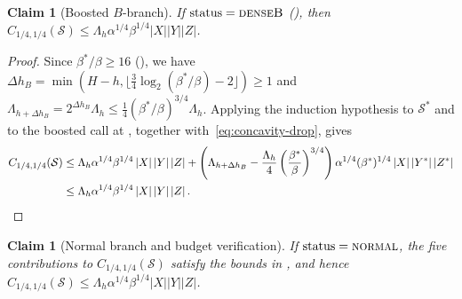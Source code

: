 \documentclass[11pt]{article}
\newtheorem{claim}[theorem]{Claim}
\theoremstyle{definition}
\renewcommand{\label}[1]{}%
\newcommand{\abs}[1]{\left\lvert #1 \right\rvert}
\newcommand{\pot}{C_{1/4,1/4}}
\newcommand{\tagdenseB}{\textnormal{\textsc{denseB}}}
\newcommand{\tagnormal}{\textnormal{\textsc{normal}}}
\begin{document}
\begin{claim}[Boosted $B$-branch]
\label{clm:pot-boost}
If $\text{status} = \tagdenseB$ (), then $\pot(\mathcal{S}) \le \Lambda_h \alpha^{1/4}\beta^{1/4}\abs{X}\abs{Y}\abs{Z}$.
\end{claim}

\begin{proof}
Since $\beta^*/\beta \ge 16$ (), we have $\Delta h_B = \min(H-h, \lfloor \frac{3}{4}\log_2(\beta^*/\beta) - 2 \rfloor) \ge 1$ and $\Lambda_{h + \Delta h_B} = 2^{\Delta h_B}\Lambda_h \le \frac{1}{4}(\beta^*/\beta)^{3/4}\Lambda_h$. Applying the induction hypothesis to $\mathcal{S}^*$ and to the boosted call at , together with~\eqref{eq:concavity-drop}, gives
\begin{align*}
    \pot(\mathcal{S}) &\le \Lambda_h \alpha^{1/4}\beta^{1/4}\abs{X}\abs{Y}\abs{Z} + \left(\Lambda_{h + \Delta h_B} - \frac{\Lambda_h}{4}\left(\frac{\beta^*}{\beta}\right)^{3/4}\right)\alpha^{1/4}(\beta^*)^{1/4}\abs{X}\abs{Y^*}\abs{Z^*} \\
    &\le \Lambda_h \alpha^{1/4}\beta^{1/4}\abs{X}\abs{Y}\abs{Z}. \qedhere
\end{align*}
\end{proof}

\begin{claim}[Normal branch and budget verification]
\label{clm:pot-normal}
If $\text{status} = \tagnormal$, the five contributions to $\pot(\mathcal{S})$ satisfy the bounds in , and hence $\pot(\mathcal{S}) \le \Lambda_h \alpha^{1/4}\beta^{1/4}\abs{X}\abs{Y}\abs{Z}$.
\end{claim}
\end{document}
